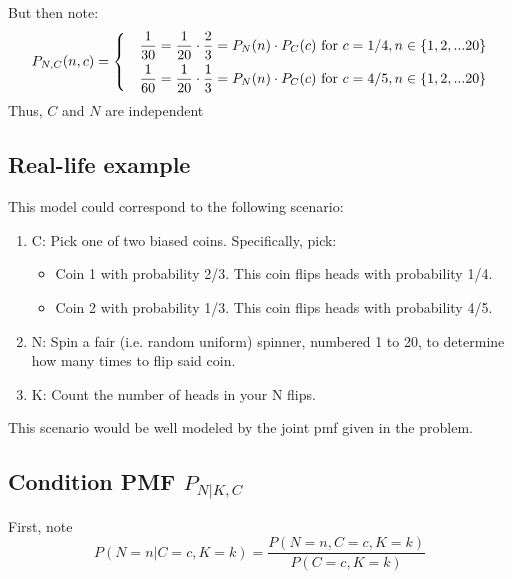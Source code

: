 \documentclass[paper=a4, fontsize=11pt]{scrartcl} %
\numberwithin{equation}{section} %
\numberwithin{figure}{section} %
\numberwithin{table}{section} %
\begin{document}
But then note:
\[
P_{N,C}(n,c) = 
 \begin{dcases}
   & \frac{1}{30} = \frac{1}{20} \cdot \frac{2}{3} = P_N(n) \cdot P_C(c) \textrm{  for } c = 1/4, n \in \{1, 2, ... 20\} \\
   & \frac{1}{60} = \frac{1}{20} \cdot \frac{1}{3} = P_N(n) \cdot P_C(c) \textrm{  for } c = 4/5, n \in \{1, 2, ... 20\} 
   \end{dcases}
\]
Thus, $C$ and $N$ are independent

\subsection{Real-life example}

This model could correspond to the following scenario:
\begin{enumerate}
   \item C: Pick one of two biased coins. Specifically, pick:
      \begin{itemize}
         \item Coin 1 with probability 2/3. This coin flips heads with probability 1/4.
         \item Coin 2 with probability 1/3. This coin flips heads with probability 4/5.
      \end{itemize}
   \item N: Spin a fair (i.e. random uniform) spinner, numbered 1 to 20, to determine how many times to flip said coin. 
   \item K: Count the number of heads in your N flips.
\end{enumerate}

This scenario would be well modeled by the joint pmf given in the problem.

\subsection{Condition PMF $P_{N | K, C}$}

First, note
\[P(N = n | C = c, K = k) = \frac{P(N = n, C = c, K = k)}{P(C = c, K = k)}\]
\end{document}
